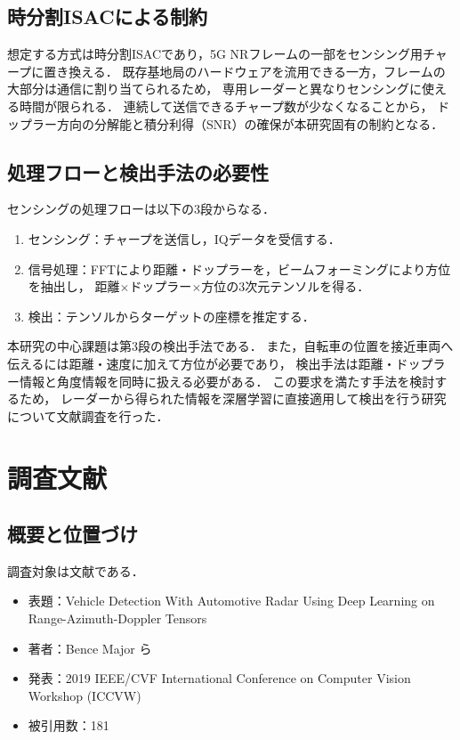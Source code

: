 \documentclass[a4paper,10.5pt,dvipdfmx]{jsarticle}
\begin{document}
\subsection{時分割ISACによる制約}
\label{sec:constraint}

想定する方式は時分割ISACであり，5G NRフレームの一部をセンシング用チャープに置き換える．
既存基地局のハードウェアを流用できる一方，フレームの大部分は通信に割り当てられるため，
専用レーダーと異なりセンシングに使える時間が限られる．
連続して送信できるチャープ数が少なくなることから，
ドップラー方向の分解能と積分利得（SNR）の確保が本研究固有の制約となる．

\subsection{処理フローと検出手法の必要性}

センシングの処理フローは以下の3段からなる．

\begin{enumerate}
  \item センシング：チャープを送信し，IQデータを受信する．
  \item 信号処理：FFTにより距離・ドップラーを，ビームフォーミングにより方位を抽出し，
        距離$\times$ドップラー$\times$方位の3次元テンソルを得る．
  \item 検出：テンソルからターゲットの座標を推定する．
\end{enumerate}

本研究の中心課題は第3段の検出手法である．
また，自転車の位置を接近車両へ伝えるには距離・速度に加えて方位が必要であり，
検出手法は距離・ドップラー情報と角度情報を同時に扱える必要がある．
この要求を満たす手法を検討するため，
レーダーから得られた情報を深層学習に直接適用して検出を行う研究について文献調査を行った．

\section{調査文献}
\label{sec:paper}

\subsection{概要と位置づけ}

調査対象は文献\cite{9022248}である．

\begin{itemize}
  \item 表題：Vehicle Detection With Automotive Radar Using Deep Learning on
        Range-Azimuth-Doppler Tensors
  \item 著者：Bence Major ら
  \item 発表：2019 IEEE/CVF International Conference on Computer Vision Workshop (ICCVW)
  \item 被引用数：181
\end{itemize}
\end{document}
